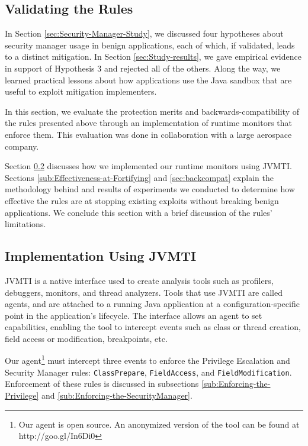\documentclass{sig-alternate}
\begin{document}
\subsection{Validating the Rules}\label{sec:Mitigations}

In Section \ref{sec:Security-Manager-Study}, we discussed four hypotheses about security manager usage in benign applications, each
of which, if validated, leads to a distinct mitigation. In Section
\ref{sec:Study-results}, we gave empirical evidence in support of
Hypothesis 3 and rejected all of the others. Along the way, we learned
practical lessons about how applications use the Java sandbox that
are useful to exploit mitigation implementers. 

In this section, we evaluate the protection merits and backwards-compatibility of the rules presented above through an implementation of runtime monitors that enforce them. This evaluation was done in collaboration
with a large aerospace company.

Section \ref{sub:Implementation-Using-JVMTI} discusses how we implemented
our runtime monitors using JVMTI. Sections \ref{sub:Effectiveness-at-Fortifying} and \ref{sec:backcompat} explain the methodology behind and results of experiments we conducted
to determine how effective the rules are at stopping existing exploits without breaking benign applications. We conclude this section with a  brief discussion of the rules' limitations.

\subsection{Implementation Using JVMTI}\label{sub:Implementation-Using-JVMTI}

JVMTI is a native interface used to create
analysis tools such as profilers, debuggers, monitors, and thread
analyzers. Tools that use JVMTI are called agents, and are attached
to a running Java application at a configuration-specific point in
the application's lifecycle. The interface allows an agent to set
capabilities, enabling the tool to intercept events such as class
or thread creation, field access or modification, breakpoints, etc.

Our agent\footnote{Our agent is open source. An anonymized version
of the tool can be found at http://goo.gl/In6Di0} must intercept three events to enforce the Privilege Escalation
and Security Manager rules: \texttt{ClassPrepare}, \texttt{FieldAccess},
and \texttt{FieldModification}. Enforcement of these rules is discussed in subsections \ref{sub:Enforcing-the-Privilege} and \ref{sub:Enforcing-the-SecurityManager}.
\end{document}

